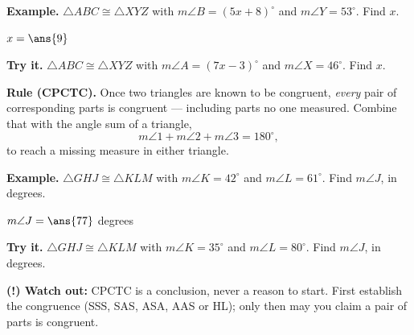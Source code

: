 \documentclass[12pt]{article}
\begin{document}
\begin{examplebox}
\textbf{Example.} $\triangle ABC \cong \triangle XYZ$ with
$m\angle B = (5x+8)^\circ$ and $m\angle Y = 53^\circ$. Find $x$.

$x = \ans{9}$
\end{examplebox}

\begin{tryitbox}
\textbf{Try it.} $\triangle ABC \cong \triangle XYZ$ with
$m\angle A = (7x-3)^\circ$ and $m\angle X = 46^\circ$. Find $x$.\\[2pt]
\end{tryitbox}


\begin{formulabox}
\textbf{Rule (CPCTC).} Once two triangles are known to be congruent,
\emph{every} pair of corresponding parts is congruent --- including parts no one
measured. Combine that with the angle sum of a triangle,
\[ m\angle 1 + m\angle 2 + m\angle 3 = 180^\circ, \]
to reach a missing measure in either triangle.
\end{formulabox}

\begin{examplebox}
\textbf{Example.} $\triangle GHJ \cong \triangle KLM$ with $m\angle K = 42^\circ$
and $m\angle L = 61^\circ$. Find $m\angle J$, in degrees.

$m\angle J = \ans{77}$ degrees
\end{examplebox}

\begin{tryitbox}
\textbf{Try it.} $\triangle GHJ \cong \triangle KLM$ with $m\angle K = 35^\circ$
and $m\angle L = 80^\circ$. Find $m\angle J$, in degrees.\\[2pt]
\end{tryitbox}

\begin{watchoutbox}
\textbf{(!) Watch out:} CPCTC is a conclusion, never a reason to start. First
establish the congruence (SSS, SAS, ASA, AAS or HL); only then may you claim a
pair of parts is congruent.
\end{watchoutbox}
\end{document}
